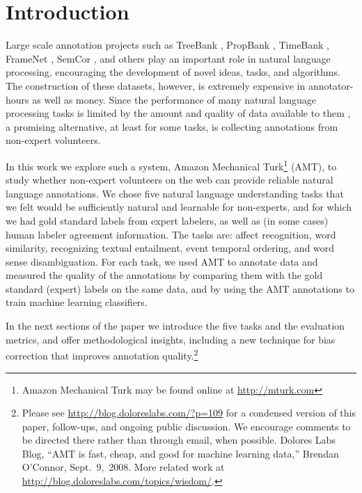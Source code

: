 \documentclass[11pt]{article}
\newcommand{\hurl}[1]{\href{#1}{\scriptsize{\url{#1}}}}
\begin{document}
\section{Introduction}

Large scale annotation projects such as TreeBank \cite{TreeBank}, PropBank \cite{PropBank}, TimeBank \cite{TimeBank}, FrameNet \cite{FrameNet}, SemCor
\cite{SemCor}, and others play an
important role in natural language processing,
encouraging the development of novel ideas, tasks, and algorithms.
The construction of these datasets, however, is extremely expensive in annotator-hours as well as money.  Since the performance of many natural language processing tasks is limited by the amount
and quality of data available to them \cite{Banko:01}, a promising alternative, at least for some tasks, is collecting annotations from non-expert volunteers.

In this work we explore such a system, Amazon Mechanical Turk\footnote{Amazon Mechanical Turk may be found online at
\hurl{http://mturk.com}}
(AMT), to study whether non-expert volunteers on
the web can provide reliable natural language annotations.
We chose five natural language understanding tasks that we felt would be sufficiently natural and learnable for non-experts, and for which we had gold standard labels from expert labelers, as well as (in some cases) human labeler agreement information.
The tasks are: affect recognition, word similarity, recognizing
textual entailment, event temporal ordering, and word sense
disambiguation.   
For each task, we used AMT to annotate data and
measured the quality of the annotations by comparing them with the
gold standard (expert) labels on the same data, and by using the AMT annotations to train machine learning classifiers. 

In the next sections  of the paper
we introduce the five tasks and the evaluation metrics, and offer
methodological insights, including a new technique for bias correction
that improves annotation quality.\footnote{
Please see \hurl{http://blog.doloreslabs.com/?p=109} for a condensed version of this paper, follow-ups, and ongoing public discussion.  We encourage comments to be directed there rather than through email, when possible.  Dolores Labs Blog, ``AMT is fast, cheap, and good for machine learning data,'' Brendan O'Connor, Sept.~9,~2008.  More related work at \hurl{http://blog.doloreslabs.com/topics/wisdom/}.}
\end{document}
